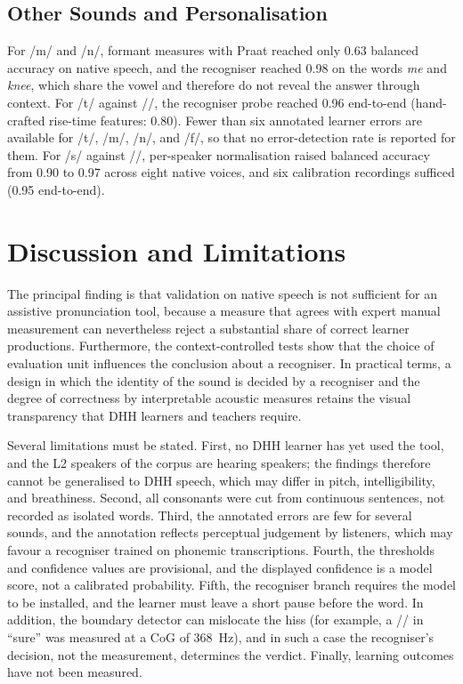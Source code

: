 \documentclass[conference]{IEEEtran}
\newcommand{\ipa}[1]{/#1/}
\begin{document}
\subsection{Other Sounds and Personalisation}
For \ipa{m} and \ipa{n}, formant measures with Praat reached only 0.63 balanced accuracy on native speech, and the recogniser reached 0.98 on the words \textit{me} and \textit{knee}, which share the vowel and therefore do not reveal the answer through context. For \ipa{t\textesh} against \ipa{\textesh}, the recogniser probe reached 0.96 end-to-end (hand-crafted rise-time features: 0.80). Fewer than six annotated learner errors are available for \ipa{t\textesh}, \ipa{m}, \ipa{n}, and \ipa{f}, so that no error-detection rate is reported for them. For \ipa{s} against \ipa{\textesh}, per-speaker normalisation raised balanced accuracy from 0.90 to 0.97 across eight native voices, and six calibration recordings sufficed (0.95 end-to-end).

\section{Discussion and Limitations}\label{sec:disc}
The principal finding is that validation on native speech is not sufficient for an assistive pronunciation tool, because a measure that agrees with expert manual measurement can nevertheless reject a substantial share of correct learner productions. Furthermore, the context-controlled tests show that the choice of evaluation unit influences the conclusion about a recogniser. In practical terms, a design in which the identity of the sound is decided by a recogniser and the degree of correctness by interpretable acoustic measures retains the visual transparency that DHH learners and teachers require.

Several limitations must be stated. First, no DHH learner has yet used the tool, and the L2 speakers of the corpus are hearing speakers; the findings therefore cannot be generalised to DHH speech, which may differ in pitch, intelligibility, and breathiness. Second, all consonants were cut from continuous sentences, not recorded as isolated words. Third, the annotated errors are few for several sounds, and the annotation reflects perceptual judgement by listeners, which may favour a recogniser trained on phonemic transcriptions. Fourth, the thresholds and confidence values are provisional, and the displayed confidence is a model score, not a calibrated probability. Fifth, the recogniser branch requires the model to be installed, and the learner must leave a short pause before the word. In addition, the boundary detector can mislocate the hiss (for example, a \ipa{\textesh} in ``sure'' was measured at a CoG of 368~Hz), and in such a case the recogniser's decision, not the measurement, determines the verdict. Finally, learning outcomes have not been measured.
\end{document}
